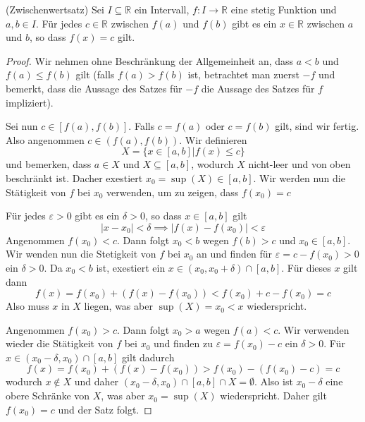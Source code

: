 \documentclass[../Analysis1_script.tex]{subfiles}
\begin{document}
\begin{proposition}{(Zwischenwertsatz)}
	Sei $I \subseteq \mathbb{R}$ ein Intervall, $f : I \to \mathbb{R}$ eine stetig Funktion und $a, b \in I$. Für jedes $c \in \mathbb{R}$ zwischen $f(a)$ und $f(b)$ gibt es ein $x \in \mathbb{R}$ zwischen $a$ und $b$, so dass $f(x) = c$ gilt.
\end{proposition}



\begin{proof}
	Wir nehmen ohne Beschränkung der Allgemeinheit an, dass $a < b$ und $f(a) \leq f(b)$ gilt (falls $f(a) > f(b)$ ist, betrachtet man zuerst $-f$ und bemerkt, dass die Aussage des Satzes für $-f$ die Aussage des Satzes für $f$ impliziert).
	
	Sei nun $c \in [f(a), f(b)]$. Falls $c = f(a)$ oder $c = f(b)$ gilt, sind wir fertig. Also angenommen $c \in (f(a), f(b))$. Wir definieren 
	\[X = \{x \in [a, b] | f(x) \leq c\}\]
	und bemerken, dass $a \in X$ und $X \subseteq [a, b]$, wodurch $X$ nicht-leer und von oben beschränkt ist. Dacher exestiert $x_0 = \sup(X) \in [a, b]$. Wir werden nun die Stätigkeit von $f$ bei $x_0$ verwenden, um zu zeigen, dass $f(x_0) = c$
	
	Für jedes $\varepsilon > 0$ gibt es ein $\delta > 0$, so dass $x \in [a, b]$ gilt
	\[|x - x_0| < \delta \implies |f(x) - f(x_0)| < \varepsilon\]
	Angenommen $f(x_0) < c$. Dann folgt $x_0 < b$ wegen $f(b) > c$ und $x_0 \in [a, b]$. Wir wenden nun die Stetigkeit von $f$ bei $x_0$ an und finden für $\varepsilon = c - f(x_0) > 0$ ein $\delta > 0$. Da $x_0 < b$ ist, exestiert ein $x \in (x_0, x_0 + \delta) \cap [a, b]$. Für dieses $x$ gilt dann 
	\[f(x) = f(x_0) + (f(x) - f(x_0)) < f(x_0) + c - f(x_0) = c\]
	Also muss $x$ in $X$ liegen, was aber $\sup(X) = x_0 < x$ wiederspricht.
	
	Angenommen $f(x_0) > c$. Dann folgt $x_0 > a$ wegen $f(a) < c$. Wir verwenden wieder die Stätigkeit von $f$ bei $x_0$ und finden zu $\varepsilon = f(x_0) - c$ ein $\delta > 0$. Für $x \in (x_0 - \delta, x_0) \cap [a, b]$ gilt dadurch
	\[f(x) = f(x_0) + (f(x) - f(x_0)) > f(x_0) - (f(x_0) - c) = c\]
	wodurch $x \notin X$ und daher $(x_0 - \delta, x_0) \cap [a, b] \cap X = \emptyset$. Also ist $x_0 - \delta$ eine obere Schränke von $X$, was aber $x_0 = \sup(X)$ wiederspricht. Daher gilt $f(x_0) = c$ und der Satz folgt.
\end{proof}
\end{document}
